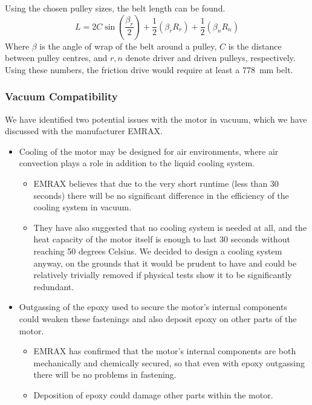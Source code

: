 \documentclass[main.tex]{subfiles}
\begin{document}
Using the chosen pulley sizes, the belt length can be found.
\begin{equation}
L = 2C\sin{(\frac{\beta_r}{2})}+{\frac{1}{2}}(\beta_rR_r)+{\frac{1}{2}}(\beta_nR_n)
\end{equation}
Where $\beta$ is the angle of wrap of the belt around a pulley, $C$ is the distance between pulley centres, and $r,n$ denote driver and driven pulleys, respectively.
Using these numbers, the friction drive would require at least a \SI{778}{mm} belt.

    \subsubsection{Vacuum Compatibility}
    We have identified two potential issues with the motor in vacuum, which we have discussed with the manufacturer EMRAX.
    \begin{itemize}
        \item Cooling of the motor may be designed for air environments, where air convection plays a role in addition to the liquid cooling system.
        \begin{itemize}
            \item EMRAX believes that due to the very short runtime (less than 30 seconds) there will be no significant difference in the efficiency of the cooling system in vacuum.
            \item They have also suggested that no cooling system is needed at all, and the heat capacity of the motor itself is enough to last 30 seconds without reaching 50 degrees Celsius. We decided to design a cooling system anyway, on the grounds that it would be prudent to have and could be relatively trivially removed if physical tests show it to be significantly redundant.
        \end{itemize}
        \item Outgassing of the epoxy used to secure the motor’s internal components could weaken these fastenings and also deposit epoxy on other parts of the motor.
        \begin{itemize}
            \item EMRAX has confirmed that the motor’s internal components are both mechanically and chemically secured, so that even with epoxy outgassing there will be no problems in fastening.
            \item Deposition of epoxy could damage other parts within the motor.
        \end{itemize}
    \end{itemize}
\end{document}
